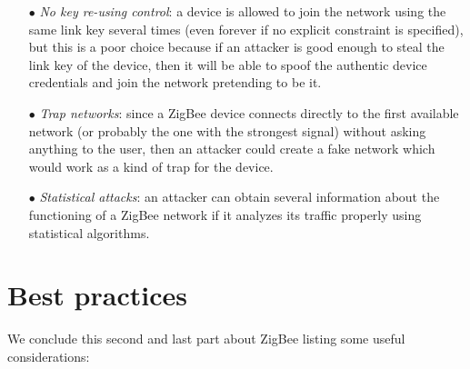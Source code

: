 \documentclass[12pt]{report}
\begin{document}
{\begin{itemize}
\begin{itemize}
\item \emph{Flooding}: it consists in the simple sending of tons of messages towards victim devices. For instance, an attacker could replay all the messages it is able to craft (or create legit messages, if it already knows the network key).\\
This kind of attack where the replay messages are sent to all the network devices is called \emph{broadcast storm attack}.\\

\item \emph{Physical Jamming}: this is a physical attack which involves tools able to cause signal interferences big enough to prevent communication among devices.\\

\item \emph{Sinkhole attack}: this attack consists in sending messages in the network in order to compromise communication, altering the routing tables and redirecting the traffic to a fake device through fake routing paths, which cannot be able to carry on the transmission.
\end{itemize}

\item[$\bullet$] \emph{No key re-using control}: a device is allowed to join the network using the same link key several times (even forever if no explicit constraint is specified), but this is a poor choice because if an attacker is good enough to steal the link key of the device, then it will be able to spoof the authentic device credentials and join the network pretending to be it.

\item[$\bullet$] \emph{Trap networks}: since a ZigBee device connects directly to the first available network (or probably the one with the strongest signal) without asking anything to the user, then an attacker could create a fake network which would work as a kind of trap for the device.

\item[$\bullet$] \emph{Statistical attacks}: an attacker can obtain several information about the functioning of a ZigBee network if it analyzes its traffic properly using statistical algorithms.\\ 
\end{itemize}

\clearpage
\section{Best practices}
\bigskip
We conclude this second and last part about ZigBee listing some useful considerations:

}
\end{document}
